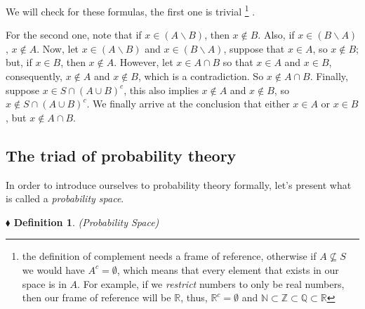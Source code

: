 \documentclass{report}
\newcommand*{\daggerfootnote}[1]{%
  \begingroup
  \renewcommand*{\thefootnote}{\fnsymbol{footnote}}%
  \footnote{#1}%
  \endgroup
}
\newtheorem{definition}{$\blacklozenge$ Definition}[chapter]
\begin{document}
We will check for these formulas, the first one is trivial \daggerfootnote{the definition of complement needs a frame of reference, otherwise if $A\nsubseteq S$ 
we would have $A^{c} = \emptyset$, which means that every element that exists in our space is in $A$.
For example, if we \textit{restrict} numbers to only be real numbers, then our frame of reference will 
be $\mathbb{R}$, thus, $\mathbb{R}^{c} = \emptyset$ and $\mathbb{N}\subset\mathbb{Z}\subset\mathbb{Q}\subset\mathbb{R}$}. 

For the second one, note that if $x\in (A\backslash B)$, 
then $x\notin B$. Also, if $x\in (B\backslash A)$, $x\notin A$. Now, let $x\in (A\backslash B)$ and $x\in (B \backslash A)$, 
suppose that $x\in A$, so $x\notin B$; but, if $x\in B$, then $x\notin A$. However, let $x\in A\cap B$ so that $x\in A$ and $x\in B$,
consequently, $x\notin A$ and $x\notin B$, which is a contradiction. So $x\notin A\cap B$. Finally, suppose $x\in S\cap (A\cup B)^{c}$,
this also implies $x\notin A$ and $x \notin B$, so $x\notin S\cap(A\cup B)^{c}$. We finally arrive at the conclusion that 
either $x\in A$ or $x\in B$, but $x\notin A\cap B$.

\subsection{The triad of probability theory}
In order to introduce ourselves to probability theory formally, let's present 
what is called a \textit{probability space}.
\begin{definition} (Probability Space)
    
\end{definition}
\end{document}

